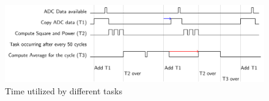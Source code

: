 \begin{figure} 
	\centering
	\includegraphics[width=1\linewidth]{tikz/timing}
	\caption[Time utilized by different tasks]{Time utilized by different tasks}
	\label{fig:timing}
	\vspace*{-3ex}
\end{figure}
